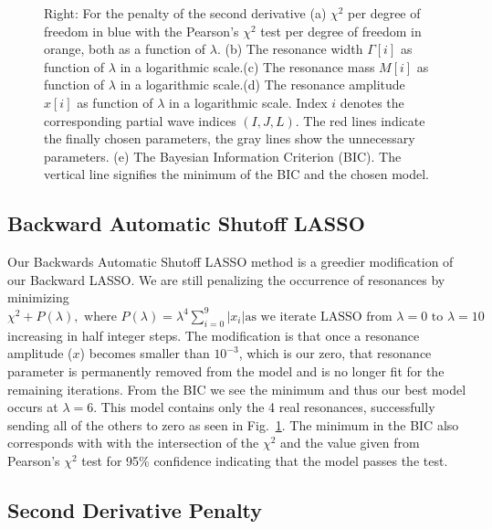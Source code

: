 \documentclass[aps, prd, twocolumn, showpacs, superscriptaddress,
preprintnumbers, nofootinbib]{revtex4-1}
\begin{document}
\begin{figure}
\begin{center}
{Right: For the penalty of the second derivative (a) $\chi^2$ per degree of freedom in blue with the Pearson's $\chi^2$ test per degree of freedom in orange, both as a function of $\lambda$. (b) The resonance width $\Gamma[i]$ as function of $\lambda$ in a logarithmic scale.(c) The resonance mass $M[i]$ as function of $\lambda$ in a logarithmic scale.(d) The resonance amplitude $x[i]$ as function of $\lambda$ in a logarithmic scale. Index $i$ denotes the corresponding partial wave indices $(I,J,L)$. The red lines indicate the finally chosen parameters, the gray lines show the unnecessary parameters. (e) The Bayesian Information Criterion (BIC). The vertical line signifies the minimum of the BIC and the chosen model.}
\label{fig:Fig5}
\end{center}
\end{figure}

\subsection{Backward Automatic Shutoff LASSO}

Our Backwards Automatic Shutoff LASSO method is a greedier modification of our Backward LASSO. We are still penalizing the occurrence of resonances by minimizing  $\chi^2+P(\lambda), \text{ where } P(\lambda) =   \lambda^4 \sum_{i=0}^{9}  |x_i|   \text{as we iterate LASSO from } \lambda = 0 \text{ to } \lambda = 10$ increasing in half integer steps. The modification is that once a resonance amplitude ($x$) becomes smaller than $10^{-3}$, which is our zero, that resonance parameter is permanently removed from the model and is no longer fit for the remaining iterations. From the BIC we see the minimum and thus our best model occurs at $\lambda=6$. This model contains only the 4 real resonances, successfully sending all of the others to zero as seen in Fig.~\ref{fig:Fig5}. The minimum in the BIC also corresponds with with the intersection of the $\chi^2$ and the value given from Pearson's $\chi^2$ test  for 95\% confidence indicating that the model passes the test.




\subsection{Second Derivative Penalty}
\end{document}
